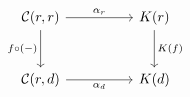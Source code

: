 \documentclass[border=6pt]{standalone}
\newcommand{\cat}[1]{\mathcal{#1}}
\newcommand{\CC}{\cat{C}}
\begin{document}
$
\begin{tikzcd}[column sep=huge, row sep=large]
  \CC(r,r) \arrow[r, "\alpha_r"] \arrow[d, "f \circ (-)"'] & K(r) \arrow[d, "K(f)"] \\
  \CC(r,d) \arrow[r, "\alpha_d"'] & K(d)
\end{tikzcd}
$
\end{document}
